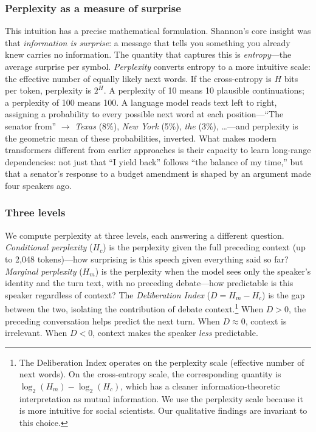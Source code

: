 \documentclass[12pt]{article}
\newcommand{\Hc}{H_c}
\newcommand{\Hm}{H_m}
\newcommand{\DI}{\mathit{D}}
\begin{document}
\subsubsection*{Perplexity as a measure of surprise}
This intuition has a precise mathematical formulation. Shannon's \citeyearpar{shannon1948} core insight was that \textit{information is surprise}: a message that tells you something you already knew carries no information. The quantity that captures this is \textit{entropy}---the average surprise per symbol. \textit{Perplexity} converts entropy to a more intuitive scale: the effective number of equally likely next words. If the cross-entropy is $H$ bits per token, perplexity is $2^H$. A perplexity of 10 means 10 plausible continuations; a perplexity of 100 means 100. A language model reads text left to right, assigning a probability to every possible next word at each position---``The senator from'' $\rightarrow$ \textit{Texas} (8\%), \textit{New York} (5\%), \textit{the} (3\%), \ldots{}---and perplexity is the geometric mean of these probabilities, inverted. What makes modern transformers \citep{vaswani2017} different from earlier approaches is their capacity to learn long-range dependencies: not just that ``I yield back'' follows ``the balance of my time,'' but that a senator's response to a budget amendment is shaped by an argument made four speakers ago.

\subsubsection*{Three levels}
We compute perplexity at three levels, each answering a different question. \textit{Conditional perplexity} ($\Hc$) is the perplexity given the full preceding context (up to 2,048 tokens)---how surprising is this speech given everything said so far? \textit{Marginal perplexity} ($\Hm$) is the perplexity when the model sees only the speaker's identity and the turn text, with no preceding debate---how predictable is this speaker regardless of context? The \textit{Deliberation Index} ($\DI = \Hm - \Hc$) is the gap between the two, isolating the contribution of debate context.\footnote{The Deliberation Index operates on the perplexity scale (effective number of next words). On the cross-entropy scale, the corresponding quantity is $\log_2(\Hm) - \log_2(\Hc)$, which has a cleaner information-theoretic interpretation as mutual information. We use the perplexity scale because it is more intuitive for social scientists. Our qualitative findings are invariant to this choice.} When $\DI > 0$, the preceding conversation helps predict the next turn. When $\DI \approx 0$, context is irrelevant. When $\DI < 0$, context makes the speaker \textit{less} predictable.
\end{document}
